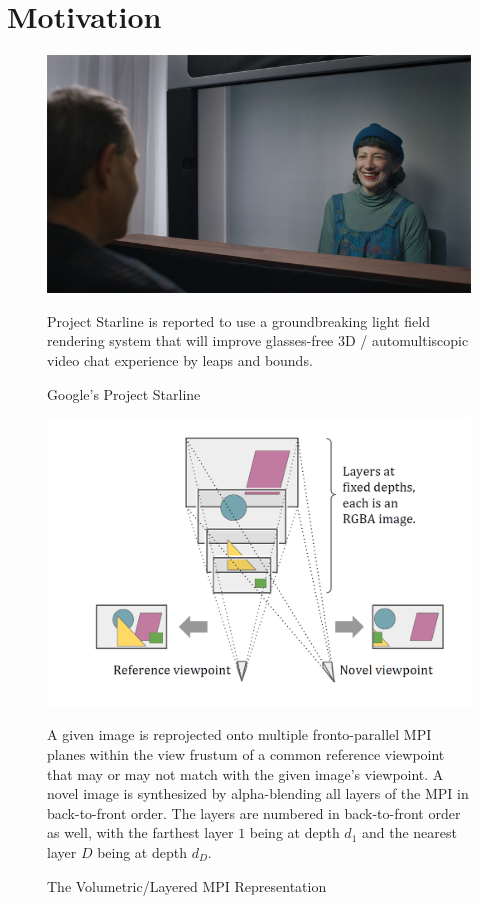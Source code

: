 \section{Motivation}\label{sec:motivation} 

\begin{figure}[!h]
    \includegraphics[width=1\columnwidth]{figures/google-starline-416.png}
    \caption{Google's Project Starline~\cite{bavor_project_2021}}
    \label{fig:google-starline}
    {\small Project Starline is reported to use a groundbreaking light field rendering system that will improve glasses-free 3D / automultiscopic video chat experience by leaps and bounds.}
\end{figure}

\begin{figure}[!h]
    \includegraphics[width=1\columnwidth]{figures/mpi-layered-representation.png}
    \caption{The Volumetric/Layered MPI Representation~\cite{zhou2018stereo}}
    \label{fig:mpi-layered-representation}
    {\small A given image is reprojected onto multiple fronto-parallel MPI planes within the view frustum of a common reference viewpoint that may or may not match with the given image's viewpoint. A novel image is synthesized by alpha-blending all layers of the MPI in back-to-front order. The layers are numbered in back-to-front order as well, with the farthest layer $1$ being at depth $d_1$ and the nearest layer $D$ being at depth $d_D$.}
\end{figure}


